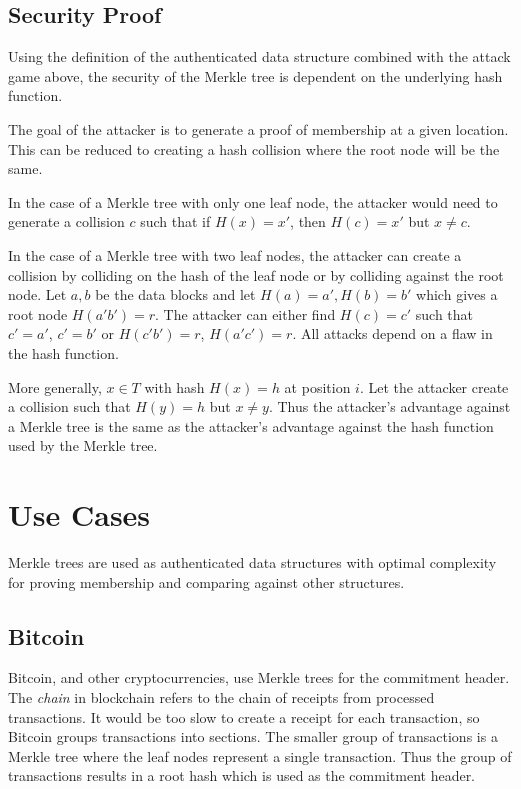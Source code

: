 \documentclass[12pt]{article}
\begin{document}
\subsection{Security Proof}

Using the definition of the authenticated data structure combined with the attack game above, the security of the Merkle tree is dependent on the underlying hash function. 

The goal of the attacker is to generate a proof of membership at a given location. This can be reduced to creating a hash collision where the root node will be the same.

In the case of a Merkle tree with only one leaf node, the attacker would need to generate a collision $c$ such that if $H(x) = x'$, then $H(c)=x'$ but $x\neq c$.

In the case of a Merkle tree with two leaf nodes, the attacker can create a collision by colliding on the hash of the leaf node or by colliding against the root node. Let $a, b$ be the data blocks and let $H(a)=a', H(b)=b'$ which gives a root node $H(a'b')=r$. The attacker can either find $H(c)=c'$ such that $c' = a'$, $c'=b'$ or $H(c'b') = r$, $H(a'c') = r$. All attacks depend on a flaw in the hash function.

More generally, $x \in T$ with hash $H(x) = h$ at position $i$. Let the attacker create a collision such that $H(y) = h$ but $x \neq y$. Thus the attacker's advantage against a Merkle tree is the same as the attacker's advantage against the hash function used by the Merkle tree.


\section{Use Cases}

Merkle trees are used as authenticated data structures with optimal complexity for proving membership and comparing against other structures. 

\subsection{Bitcoin} \label{sec:Bitcoin}

Bitcoin, and other cryptocurrencies, use Merkle trees for the commitment header.  The \textit{chain} in blockchain refers to the chain of receipts from processed transactions. It would be too slow to create a receipt for each transaction, so Bitcoin groups transactions into sections. The smaller group of transactions is a Merkle tree where the leaf nodes represent a single transaction. Thus the group of transactions results in a root hash which is used as the commitment header.
\end{document}
